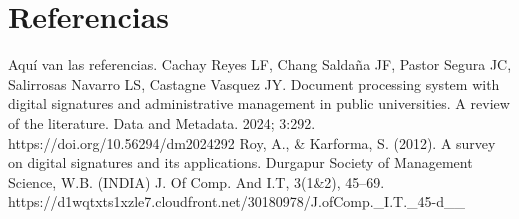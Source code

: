 \documentclass[a4paper,12pt]{report}
\begin{document}
\chapter{Referencias}
Aquí van las referencias.
Cachay Reyes LF, Chang Saldaña JF, Pastor Segura JC, Salirrosas Navarro LS, Castagne Vasquez JY. Document processing system
with digital signatures and administrative management in public universities. A review of the literature. Data and Metadata. 2024; 3:292.
https://doi.org/10.56294/dm2024292
Roy, A., & Karforma, S. (2012). A survey on digital signatures and its applications. Durgapur Society of Management Science, W.B. (INDIA) J. Of Comp. And I.T, 3(1&2), 45–69. https://d1wqtxts1xzle7.cloudfront.net/30180978/J.ofComp._I.T._45-d__%

‌
\end{document}
